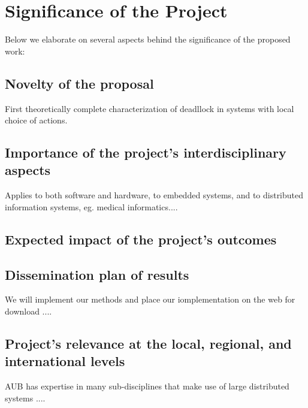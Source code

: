 \section{Significance of the Project}

Below we elaborate on several aspects behind the significance of the proposed work:

\subsection{Novelty of the proposal}

First theoretically complete characterization of deadllock in systems
with local choice of actions.


\subsection{Importance of the project's interdisciplinary aspects}

Applies to both software and hardware,  to embedded systems, and to
distributed information systems, eg. medical informatics....


\subsection{Expected impact of the project's outcomes}





\subsection{Dissemination plan of results}

We will implement our methods and place our iomplementation on the web
for download ....


\subsection{Project's relevance at the local, regional, and international levels}

AUB has expertise in many sub-disciplines that make use of large
distributed systems ....

